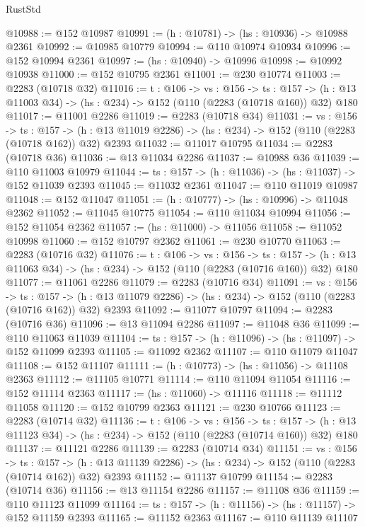 \begin{lexlean}{RustStd}
\begin{coremodule}
@10988 := @152 @10987
@10991 := (h : @10781) -> (hs : @10936) -> @10988 @2361
@10992 := @10985 @10779
@10994 := @110 @10974 @10934
@10996 := @152 @10994 @2361
@10997 := (hs : @10940) -> @10996
@10998 := @10992 @10938
@11000 := @152 @10795 @2361
@11001 := @230 @10774
@11003 := @2283 (@10718 @32)
@11016 := {t : @106} ->
  {vs : @156} ->
  {ts : @157} -> (h : @13 @11003 @34) -> (hs : @234) -> @152 (@110 (@2283 (@10718 @160)) @32) @180
@11017 := @11001 @2286
@11019 := @2283 (@10718 @34)
@11031 := {vs : @156} ->
  {ts : @157} ->
  (h : @13 @11019 @2286) -> (hs : @234) -> @152 (@110 (@2283 (@10718 @162)) @32) @2393
@11032 := @11017 @10795
@11034 := @2283 (@10718 @36)
@11036 := @13 @11034 @2286
@11037 := @10988 @36
@11039 := @110 @11003 @10979
@11044 := {ts : @157} -> (h : @11036) -> (hs : @11037) -> @152 @11039 @2393
@11045 := @11032 @2361
@11047 := @110 @11019 @10987
@11048 := @152 @11047
@11051 := (h : @10777) -> (hs : @10996) -> @11048 @2362
@11052 := @11045 @10775
@11054 := @110 @11034 @10994
@11056 := @152 @11054 @2362
@11057 := (hs : @11000) -> @11056
@11058 := @11052 @10998
@11060 := @152 @10797 @2362
@11061 := @230 @10770
@11063 := @2283 (@10716 @32)
@11076 := {t : @106} ->
  {vs : @156} ->
  {ts : @157} -> (h : @13 @11063 @34) -> (hs : @234) -> @152 (@110 (@2283 (@10716 @160)) @32) @180
@11077 := @11061 @2286
@11079 := @2283 (@10716 @34)
@11091 := {vs : @156} ->
  {ts : @157} ->
  (h : @13 @11079 @2286) -> (hs : @234) -> @152 (@110 (@2283 (@10716 @162)) @32) @2393
@11092 := @11077 @10797
@11094 := @2283 (@10716 @36)
@11096 := @13 @11094 @2286
@11097 := @11048 @36
@11099 := @110 @11063 @11039
@11104 := {ts : @157} -> (h : @11096) -> (hs : @11097) -> @152 @11099 @2393
@11105 := @11092 @2362
@11107 := @110 @11079 @11047
@11108 := @152 @11107
@11111 := (h : @10773) -> (hs : @11056) -> @11108 @2363
@11112 := @11105 @10771
@11114 := @110 @11094 @11054
@11116 := @152 @11114 @2363
@11117 := (hs : @11060) -> @11116
@11118 := @11112 @11058
@11120 := @152 @10799 @2363
@11121 := @230 @10766
@11123 := @2283 (@10714 @32)
@11136 := {t : @106} ->
  {vs : @156} ->
  {ts : @157} -> (h : @13 @11123 @34) -> (hs : @234) -> @152 (@110 (@2283 (@10714 @160)) @32) @180
@11137 := @11121 @2286
@11139 := @2283 (@10714 @34)
@11151 := {vs : @156} ->
  {ts : @157} ->
  (h : @13 @11139 @2286) -> (hs : @234) -> @152 (@110 (@2283 (@10714 @162)) @32) @2393
@11152 := @11137 @10799
@11154 := @2283 (@10714 @36)
@11156 := @13 @11154 @2286
@11157 := @11108 @36
@11159 := @110 @11123 @11099
@11164 := {ts : @157} -> (h : @11156) -> (hs : @11157) -> @152 @11159 @2393
@11165 := @11152 @2363
@11167 := @110 @11139 @11107

\end{coremodule}
\end{lexlean}
